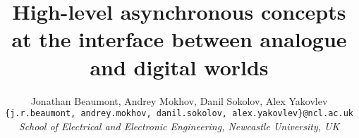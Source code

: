 \documentclass[british, journal]{IEEEtran}
\begin{document}
%
%
%
%
%
%
%
%
%
%
%
%
%
%
%
%
%
%
%
%

\title{High-level asynchronous concepts at the interface between analogue and 
digital worlds}
\author{Jonathan Beaumont, Andrey Mokhov, Danil Sokolov, Alex Yakovlev\\
\texttt{\{j.r.beaumont, andrey.mokhov, danil.sokolov, alex.yakovlev\}@ncl.ac.uk}\\
\emph{School of Electrical and Electronic Engineering, Newcastle University,
UK}}
\end{document}
